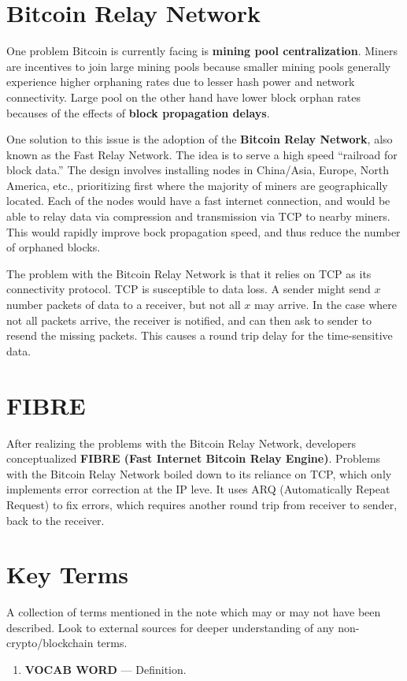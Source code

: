 \documentclass[11pt]{article}
\begin{document}
 \section*{Bitcoin Relay Network}
 
 One problem Bitcoin is currently facing is \textbf{mining pool centralization}. Miners are incentives to join large mining pools because smaller mining pools generally experience higher orphaning rates due to lesser hash power and network connectivity. Large pool on the other hand have lower block orphan rates becauses of the effects of \textbf{block propagation delays}.
 
 One solution to this issue is the adoption of the \textbf{Bitcoin Relay Network}, also known as the Fast Relay Network. The idea is to serve a high speed ``railroad for block data.'' The design involves installing nodes in China/Asia, Europe, North America, etc., prioritizing first where the majority of miners are geographically located. Each of the nodes would have a fast internet connection, and would be able to relay data via compression and transmission via TCP to nearby miners. This would rapidly improve bock propagation speed, and thus reduce the number of orphaned blocks.
 
 The problem with the Bitcoin Relay Network is that it relies on TCP as its connectivity protocol. TCP is susceptible to data loss. A sender might send $x$ number packets of data to a receiver, but not all $x$ may arrive. In the case where not all packets arrive, the receiver is notified, and can then ask to sender to resend the missing packets. This causes a round trip delay for the time-sensitive data.
 
 \section*{FIBRE}
 
 After realizing the problems with the Bitcoin Relay Network, developers conceptualized \textbf{FIBRE (Fast Internet Bitcoin Relay Engine)}. Problems with the Bitcoin Relay Network boiled down to its reliance on TCP, which only implements error correction at the IP leve. It uses ARQ (Automatically Repeat Request) to fix errors, which requires another round trip from receiver to sender, back to the receiver.

 
 
    
    
    
    
    \newpage
    \thispagestyle{firstpage}
    \vspace*{2\baselineskip}
    \section*{Key Terms}
    \noindent A collection of terms mentioned in the note which may or may not have been described. Look to external sources for deeper understanding of any non-crypto/blockchain terms.
    \begin{enumerate}
        \item \textbf{VOCAB WORD} --- Definition. %
    \end{enumerate}
\end{document}
